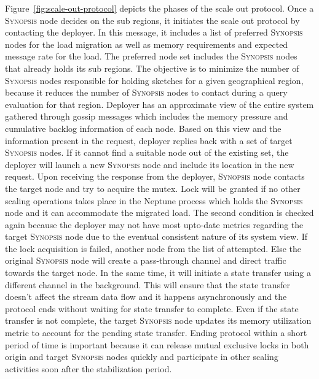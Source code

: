 Figure~\ref{fig:scale-out-protocol} depicts the phases of the scale out protocol.
Once a \textsc{Synopsis} node decides on the sub regions, it initiates the scale out protocol by contacting the deployer.
In this message, it includes a list of preferred \textsc{Synopsis} nodes for the load migration as well as memory requirements and expected message rate for the load.
The preferred node set includes the \textsc{Synopsis} nodes that already holds its sub regions.
The objective is to minimize the number of \textsc{Synopsis} nodes responsible for holding sketches for a given geographical region, because it reduces the number of \textsc{Synopsis} nodes to contact during a query evaluation for that region.
Deployer has an approximate view of the entire system gathered through gossip messages which includes the memory pressure and cumulative backlog information of each node.
Based on this view and the information present in the request, deployer replies back with a set of target \textsc{Synopsis} nodes.
If it cannot find a suitable node out of the existing set, the deployer will launch a new \textsc{Synopsis} node and include its location in the new request.
Upon receiving the response from the deployer, \textsc{Synopsis} node contacts the target node and try to acquire the mutex.
Lock will be granted if no other scaling operations takes place in the Neptune process which holds the \textsc{Synopsis} node and it can accommodate the migrated load.
The second condition is checked again because the deployer may not have most upto-date metrics regarding the target \textsc{Synopsis} node due to the eventual consistent nature of its system view.
If the lock acquisition is failed, another node from the list of attempted.
Else the original \textsc{Synopsis} node will create a pass-through channel and direct traffic towards the target node.
In the same time, it will initiate a state transfer using a different channel in the background.
This will ensure that the state transfer doesn't affect the stream data flow and it happens asynchronously and the protocol ends without waiting for state transfer to complete.
Even if the state transfer is not complete, the target \textsc{Synopsis} node updates its memory utilization metric to account for the pending state transfer. 
Ending protocol within a short period of time is important because it can release mutual exclusive locks in both origin and target \textsc{Synopsis} nodes quickly and participate in other scaling activities soon after the stabilization period.
%
